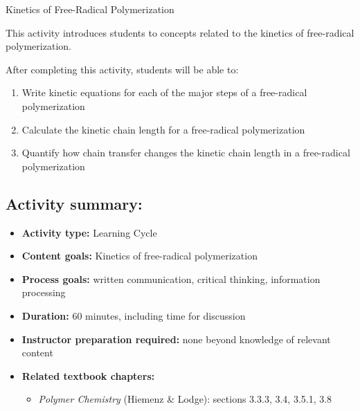 %
%
%
%

\renewcommand{\figpath}{content}
\renewcommand{\labelbase}{FRPkinetics}

\begin{activity}{Kinetics of Free-Radical Polymerization}
\label{\labelbase}

\begin{instructornotes}
	This activity introduces students to concepts related to the kinetics of free-radical polymerization.
	
	After completing this activity, students will be able to:
	\begin{enumerate}
		\item Write kinetic equations for each of the major steps of a free-radical polymerization
		\item Calculate the kinetic chain length for a free-radical polymerization
		\item Quantify how chain transfer changes the kinetic chain length in a free-radical polymerization
	\end{enumerate}
	
	\subsection*{Activity summary:}
	\begin{itemize}
		\item \textbf{Activity type:} Learning Cycle
		\item \textbf{Content goals:} Kinetics of free-radical polymerization
		\item \textbf{Process goals:} %
			written communication, critical thinking, information processing
		\item \textbf{Duration:} 60 minutes, including time for discussion
		\item \textbf{Instructor preparation required:} none beyond knowledge of relevant content
		\item \textbf{Related textbook chapters:}
			\begin{itemize}
				\item \emph{Polymer Chemistry} (Hiemenz \& Lodge): sections 3.3.3, 3.4, 3.5.1, 3.8
			\end{itemize}
	\end{itemize}
	

\end{instructornotes}
\end{activity}
